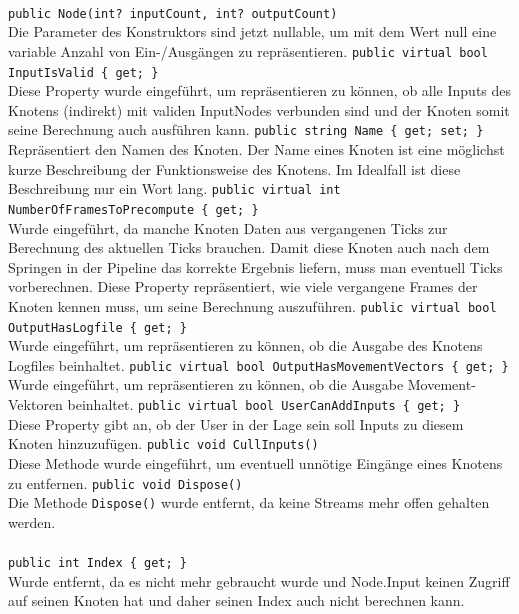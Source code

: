 \paragraph{}
\begin{itemize}
	\change \verb!public Node(int? inputCount, int? outputCount)! \\
	Die Parameter des Konstruktors sind jetzt nullable, um mit dem Wert null eine variable Anzahl von Ein-/Ausgängen zu repräsentieren.
	\add \verb!public virtual bool InputIsValid { get; }! \\
	Diese Property wurde eingeführt, um repräsentieren zu können, ob alle Inputs des Knotens (indirekt) mit validen InputNodes verbunden sind und der Knoten somit seine Berechnung auch ausführen kann.
	\add \verb!public string Name { get; set; }! \\
	Repräsentiert den Namen des Knoten. Der Name eines Knoten ist eine möglichst kurze Beschreibung der Funktionsweise des Knotens. Im Idealfall ist diese Beschreibung nur ein Wort lang.
	\add \verb!public virtual int NumberOfFramesToPrecompute { get; }! \\
	Wurde eingeführt, da manche Knoten Daten aus vergangenen Ticks zur Berechnung des aktuellen Ticks brauchen. Damit diese Knoten auch nach dem Springen in der Pipeline das korrekte Ergebnis liefern, muss man eventuell Ticks vorberechnen. Diese Property repräsentiert, wie viele vergangene Frames der Knoten kennen muss, um seine Berechnung auszuführen.
	\add \verb!public virtual bool OutputHasLogfile { get; }! \\
	Wurde eingeführt, um repräsentieren zu können, ob die Ausgabe des Knotens Logfiles beinhaltet.
	\add \verb!public virtual bool OutputHasMovementVectors { get; }! \\
	Wurde eingeführt, um repräsentieren zu können, ob die Ausgabe Movement-Vektoren beinhaltet.
	\add \verb!public virtual bool UserCanAddInputs { get; }! \\
	Diese Property gibt an, ob der User in der Lage sein soll Inputs zu diesem Knoten hinzuzufügen.
	\add \verb!public void CullInputs()! \\
	Diese Methode wurde eingeführt, um eventuell unnötige Eingänge eines Knotens zu entfernen.
	\remove \verb!public void Dispose()! \\
	Die Methode \verb!Dispose()! wurde entfernt, da keine Streams mehr offen gehalten werden.
\end{itemize}

\paragraph{}
\begin{itemize}
	\remove \verb!public int Index { get; }! \\
	Wurde entfernt, da es nicht mehr gebraucht wurde und Node.Input keinen Zugriff auf seinen Knoten hat und daher seinen Index auch nicht berechnen kann.	
\end{itemize}

